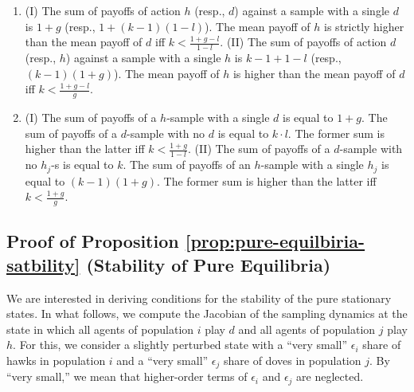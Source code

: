 \documentclass[12pt]{article}
\numberwithin{equation}{section}
\numberwithin{figure}{section}
\theoremstyle{definition}
\theoremstyle{plain}
\theoremstyle{plain}
\theoremstyle{plain}
\theoremstyle{remark}
\theoremstyle{plain}
\theoremstyle{plain}
\begin{document}
\begin{enumerate}
\item (I) The sum of payoffs of action $h$ (resp., $d$) against
a sample with a single $d$ is $1+g$ (resp., $1+\left(k-1\right)(1-l)$).
The mean payoff of $h$ is strictly higher than 
the mean payoff of $d$ iff
$k<\frac{1+g-l}{1-l}.$
(II) The sum of payoffs of action $d$ (resp., $h$) against
a sample with a single $h$ is $k-1+1-l$ (resp., $\left(k-1\right)\left(1+g\right)$).
The mean payoff of $h$ is higher than 
the mean payoff of $d$ iff $k<\frac{1+g-l}{g}$. 
\item (I) The sum of payoffs of a $h$-sample with a single $d$ is equal to $1+g$. The sum of payoffs of a $d$-sample with no $d$ is equal to $k\cdot l$. The former sum is
higher than the latter iff $k<\frac{1+g}{1-l}.$
(II) The sum of payoffs of a $d$-sample with no $h_{j}$-s is
equal to $k$. The sum of payoffs of an $h$-sample with a single
$h_{j}$ is equal to $(k-1)\left(1+g\right)$. The former sum
is higher than the latter iff $k<\frac{1+g}{g}$.\qedhere
\end{enumerate}




\subsection {Proof of Proposition \ref{prop:pure-equilbiria-satbility} (Stability of Pure Equilibria)}\label{subsec:Proof-of-Theorem-2}
We are interested in deriving conditions for the stability of the pure stationary states. 
In what follows,
we compute the Jacobian of the sampling dynamics at the state 
in which all agents of population $i$ play $d$ and all agents of population $j$ play $h$. For this, we consider a slightly perturbed state with a ``very small'' $\epsilon_i$ share of hawks in population $i$ and a ``very small'' $\epsilon_j$ share of doves in population $j.$ By ``very small,'' we mean that higher-order terms of $\epsilon_i$ and $\epsilon_j$ are neglected.
\end{document}
